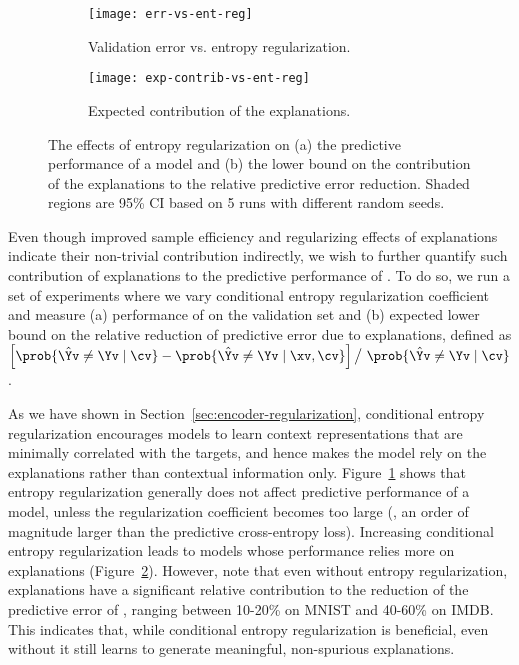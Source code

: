 \documentclass[twoside,11pt]{article}
\begin{document}
\begin{figure}[t]
    \centering
    \begin{subfigure}[b]{0.48\textwidth}
        \centering
        \texttt{[image: err-vs-ent-reg]}
        \caption{Validation error vs. entropy regularization.}
        \label{fig:err-vs-ent-reg}
    \end{subfigure}\quad
    \begin{subfigure}[b]{0.48\textwidth}
        \centering
        \texttt{[image: exp-contrib-vs-ent-reg]}
        \caption{Expected contribution of the explanations.}
        \label{fig:exp-contrib-vs-ent-reg}
    \end{subfigure}
    \caption{The effects of entropy regularization on (a) the predictive performance of a \CEN model and (b) the lower bound on the contribution of the explanations to the relative predictive error reduction.
    Shaded regions are 95\% CI based on 5 runs with different random seeds.}
    \label{fig:ent-reg-effects}
\end{figure}
 
Even though improved sample efficiency and regularizing effects of explanations indicate their non-trivial contribution indirectly, we wish to further quantify such contribution of explanations to the predictive performance of \CEN.
To do so, we run a set of experiments where we vary conditional entropy regularization coefficient and measure (a) performance of \CEN on the validation set and (b) expected lower bound on the relative reduction of predictive error due to explanations, defined as $\left[\prob{\hat\Yv \neq \Yv \mid \cv} - \prob{\hat\Yv \neq \Yv \mid \xv, \cv} \right] \big{/}\ \prob{\hat\Yv \neq \Yv \mid \cv}$.

As we have shown in Section~\ref{sec:encoder-regularization}, conditional entropy regularization encourages \CEN models to learn context representations that are minimally correlated with the targets, and hence makes the model rely on the explanations rather than contextual information only.
Figure~\ref{fig:err-vs-ent-reg} shows that entropy regularization generally does not affect predictive performance of a \CEN model, unless the regularization coefficient becomes too large (\eg, an order of magnitude larger than the predictive cross-entropy loss).
Increasing conditional entropy regularization leads to \CEN models whose performance relies more on explanations (Figure~\ref{fig:exp-contrib-vs-ent-reg}).
However, note that even without entropy regularization, explanations have a significant relative contribution to the reduction of the predictive error of \CEN, ranging between 10-20\% on MNIST and 40-60\% on IMDB.
This indicates that, while conditional entropy regularization is beneficial, even without it \CEN still learns to generate meaningful, non-spurious explanations.
\end{document}
